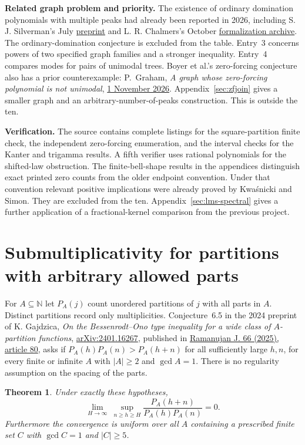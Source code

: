 \documentclass[11pt,a4paper]{article}
\newtheorem{theorem}{Theorem}[section]
\numberwithin{equation}{section}
\begin{document}
\medskip
\noindent\textbf{Related graph problem and priority.}
The existence of ordinary domination polynomials with multiple peaks
had already been reported in 2026, including S. J. Silverman's July
\href{https://doi.org/10.5281/zenodo.21587251}{preprint}
and L. R. Chalmers's October
\href{https://doi.org/10.5281/zenodo.23092986}{formalization archive}.
The ordinary-domination conjecture is excluded from the table.
Entry~3 concerns powers of two specified graph families and a stronger
inequality. Entry~4 compares modes for pairs of unimodal trees.
Boyer et al.'s zero-forcing conjecture also has a prior counterexample:
P.~Graham, \emph{A graph whose zero-forcing polynomial is not
unimodal}, \href{https://doi.org/10.5281/zenodo.23875153}{1 November
2026}. Appendix~\ref{sec:zfjoin} gives a smaller graph and an
arbitrary-number-of-peaks construction. This is outside the ten.

\medskip
\noindent\textbf{Verification.}
The source contains complete listings for the square-partition finite
check, the independent zero-forcing enumeration, and the interval checks
for the Kanter and trigamma results. A fifth verifier uses rational
polynomials for the shifted-law obstruction. The finite-bell-shape results in the appendices distinguish exact
printed zero counts from the older endpoint convention. Under that
convention relevant positive implications were already proved by
Kwa\'snicki and Simon. They are excluded from the ten. Appendix~\ref{sec:lms-spectral} gives a further application of
a fractional-kernel comparison from the previous project.
\clearpage


\section{Submultiplicativity for partitions with arbitrary allowed parts}
\label{sec:arbitrary-A}
For $A\subseteq\mathbb{N}$ let $P_A(j)$ count unordered partitions of $j$
with all parts in $A$. Distinct partitions record only multiplicities.
Conjecture~6.5 in the 2024 preprint of K. Gajdzica, \emph{On the Bessenrodt--Ono type
inequality for a wide class of $A$-partition functions},
\href{https://arxiv.org/abs/2401.16267}{arXiv:2401.16267},
published in \href{https://doi.org/10.1007/s11139-025-01048-z}
{Ramanujan J. 66 (2025), article 80},
asks if $P_A(h)P_A(n)>P_A(h+n)$ for all sufficiently large $h,n$,
for every finite or infinite $A$ with $|A|\ge2$ and $\gcd A=1$.
There is no regularity assumption on the spacing of the parts.
\begin{theorem}\label{th:arbitrary-A}
Under exactly these hypotheses,
\[
 \lim_{H\to\infty}\ \sup_{n\ge h\ge H}
 \frac{P_A(h+n)}{P_A(h)P_A(n)}=0.
\]
Furthermore the convergence is uniform over all $A$ containing a
prescribed finite set $C$ with $\gcd C=1$ and $|C|\ge5$.
\end{theorem}
\end{document}
